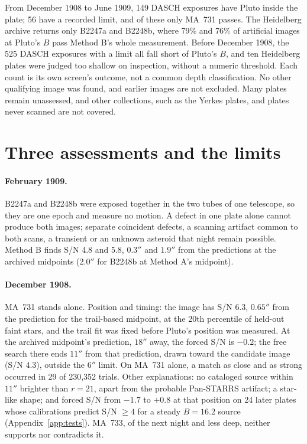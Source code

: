 \documentclass[11pt]{article}
\begin{document}
From December 1908 to June 1909, 149 DASCH exposures have Pluto inside the plate; 56 have a recorded limit, and of these only MA~731 passes. The Heidelberg archive returns only B2247a and B2248b, where 79\% and 76\% of artificial images at Pluto's $B$ pass Method B's whole measurement. Before December 1908, the 525 DASCH exposures with a limit all fall short of Pluto's $B$, and ten Heidelberg plates were judged too shallow on inspection, without a numeric threshold. Each count is its own screen's outcome, not a common depth classification. No other qualifying image was found, and earlier images are not excluded. Many plates remain unassessed, and other collections, such as the Yerkes plates, and plates never scanned are not covered.

\section{Three assessments and the limits}
\label{sec:assess}
\label{sec:limits}

\paragraph{February 1909.} B2247a and B2248b were exposed together in the two tubes of one telescope, so they are one epoch and measure no motion. A defect in one plate alone cannot produce both images; separate coincident defects, a scanning artifact common to both scans, a transient or an unknown asteroid that night remain possible. Method B finds S/N 4.8 and 5.8, $0.3''$ and $1.9''$ from the predictions at the archived midpoints ($2.0''$ for B2248b at Method A's midpoint).

\paragraph{December 1908.} MA~731 stands alone. Position and timing: the image has S/N 6.3, $0.65''$ from the prediction for the trail-based midpoint, at the 20th percentile of held-out faint stars, and the trail fit was fixed before Pluto's position was measured. At the archived midpoint's prediction, $18''$ away, the forced S/N is $-0.2$; the free search there ends $11''$ from that prediction, drawn toward the candidate image (S/N 4.3), outside the $6''$ limit. On MA~731 alone, a match as close and as strong occurred in 29 of 230,352 trials. Other explanations: no cataloged source within $11''$ brighter than $r=21$, apart from the probable Pan-STARRS artifact; a star-like shape; and forced S/N from $-1.7$ to $+0.8$ at that position on 24 later plates whose calibrations predict S/N $\ge4$ for a steady $B=16.2$ source (Appendix~\ref{app:tests}). MA~733, of the next night and less deep, neither supports nor contradicts it.
\end{document}
